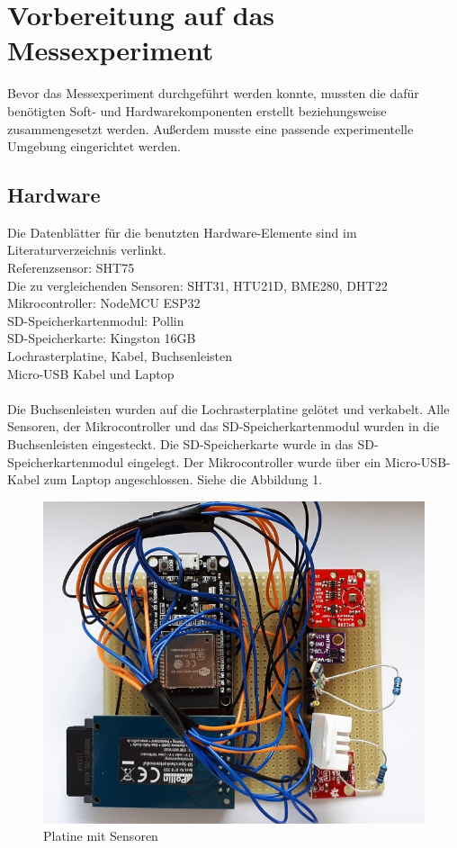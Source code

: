 \documentclass[runningheads]{llncs}
\begin{document}
\section{Vorbereitung auf das Messexperiment}Bevor das Messexperiment durchgeführt werden konnte, mussten die dafür benötigten Soft- und Hardwarekomponenten erstellt beziehungsweise zusammengesetzt werden. Außerdem musste eine passende experimentelle Umgebung eingerichtet werden.
\subsection{Hardware}
Die Datenblätter für die benutzten Hardware-Elemente sind im Literaturverzeichnis verlinkt.\\
Referenzsensor: SHT75
\\Die zu vergleichenden Sensoren: SHT31, HTU21D, BME280, DHT22
\\Mikrocontroller: NodeMCU ESP32
\\SD-Speicherkartenmodul: Pollin
\\SD-Speicherkarte: Kingston 16GB
\\Lochrasterplatine, Kabel, Buchsenleisten
\\Micro-USB Kabel und Laptop
\\\\Die Buchsenleisten wurden auf die Lochrasterplatine gelötet und verkabelt. Alle Sensoren, der Mikrocontroller und das SD-Speicherkartenmodul wurden in die Buchsenleisten eingesteckt. Die SD-Speicherkarte wurde in das SD-Speicherkartenmodul eingelegt. Der Mikrocontroller wurde über ein Micro-USB-Kabel zum Laptop angeschlossen. Siehe die Abbildung 1.

\begin{figure}[h]
\includegraphics[width=\textwidth]{pictures/platine.jpg}
\caption{Platine mit Sensoren}
\end{figure}
     
\end{document}

